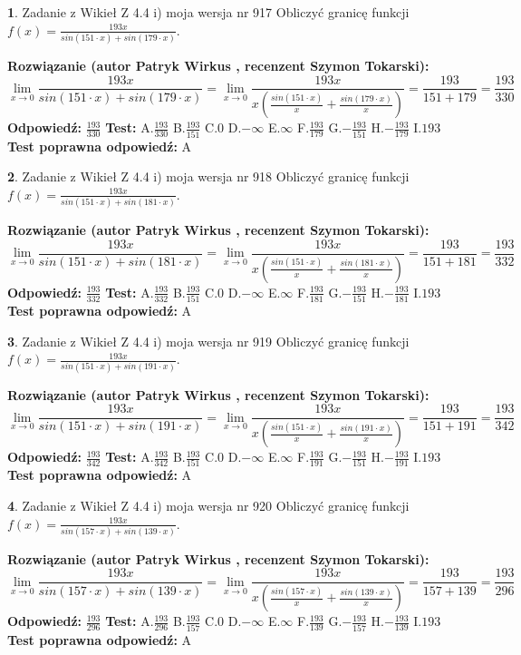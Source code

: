 \documentclass[12pt, a4paper]{article}
\theoremstyle{definition} %
\newtheorem{zad}{}
\newcommand{\zadStart}[1]{\begin{zad}#1\newline}
\newcommand{\zadStop}{\end{zad}}
\newcommand{\rozwStart}[2]{\noindent \textbf{Rozwiązanie (autor #1 , recenzent #2): }\newline}
\newcommand{\rozwStop}{\newline}
\newcommand{\odpStart}{\noindent \textbf{Odpowiedź:}\newline}
\newcommand{\odpStop}{\newline}
\newcommand{\testStart}{\noindent \textbf{Test:}\newline}
\newcommand{\testStop}{\newline}
\newcommand{\kluczStart}{\noindent \textbf{Test poprawna odpowiedź:}\newline}
\newcommand{\kluczStop}{\newline}
\begin{document}
\zadStart{Zadanie z Wikieł Z 4.4 i) moja wersja nr 917}
Obliczyć granicę funkcji $f(x)=\frac{193x}{sin(151\cdot x) +sin(179\cdot x)}$.
\zadStop
\rozwStart{Patryk Wirkus}{Szymon Tokarski}
$$\lim\limits_{x\to 0}\frac{193x}{sin(151\cdot x) +sin(179\cdot x)}=\lim\limits_{x\to 0}\frac{193x}{x(\frac{sin(151\cdot x)}{x}+\frac{sin(179\cdot x)}{x})}=\frac{193}{151+179} = \frac{193}{330}$$
\rozwStop
\odpStart
$\frac{193}{330}$
\odpStop
\testStart
A.$\frac{193}{330}$
B.$\frac{193}{151}$
C.$0$
D.$-\infty$
E.$\infty$
F.$\frac{193}{179}$
G.$-\frac{193}{151}$
H.$-\frac{193}{179}$
I.$193$
\testStop
\kluczStart
A
\kluczStop



\zadStart{Zadanie z Wikieł Z 4.4 i) moja wersja nr 918}
Obliczyć granicę funkcji $f(x)=\frac{193x}{sin(151\cdot x) +sin(181\cdot x)}$.
\zadStop
\rozwStart{Patryk Wirkus}{Szymon Tokarski}
$$\lim\limits_{x\to 0}\frac{193x}{sin(151\cdot x) +sin(181\cdot x)}=\lim\limits_{x\to 0}\frac{193x}{x(\frac{sin(151\cdot x)}{x}+\frac{sin(181\cdot x)}{x})}=\frac{193}{151+181} = \frac{193}{332}$$
\rozwStop
\odpStart
$\frac{193}{332}$
\odpStop
\testStart
A.$\frac{193}{332}$
B.$\frac{193}{151}$
C.$0$
D.$-\infty$
E.$\infty$
F.$\frac{193}{181}$
G.$-\frac{193}{151}$
H.$-\frac{193}{181}$
I.$193$
\testStop
\kluczStart
A
\kluczStop



\zadStart{Zadanie z Wikieł Z 4.4 i) moja wersja nr 919}
Obliczyć granicę funkcji $f(x)=\frac{193x}{sin(151\cdot x) +sin(191\cdot x)}$.
\zadStop
\rozwStart{Patryk Wirkus}{Szymon Tokarski}
$$\lim\limits_{x\to 0}\frac{193x}{sin(151\cdot x) +sin(191\cdot x)}=\lim\limits_{x\to 0}\frac{193x}{x(\frac{sin(151\cdot x)}{x}+\frac{sin(191\cdot x)}{x})}=\frac{193}{151+191} = \frac{193}{342}$$
\rozwStop
\odpStart
$\frac{193}{342}$
\odpStop
\testStart
A.$\frac{193}{342}$
B.$\frac{193}{151}$
C.$0$
D.$-\infty$
E.$\infty$
F.$\frac{193}{191}$
G.$-\frac{193}{151}$
H.$-\frac{193}{191}$
I.$193$
\testStop
\kluczStart
A
\kluczStop



\zadStart{Zadanie z Wikieł Z 4.4 i) moja wersja nr 920}
Obliczyć granicę funkcji $f(x)=\frac{193x}{sin(157\cdot x) +sin(139\cdot x)}$.
\zadStop
\rozwStart{Patryk Wirkus}{Szymon Tokarski}
$$\lim\limits_{x\to 0}\frac{193x}{sin(157\cdot x) +sin(139\cdot x)}=\lim\limits_{x\to 0}\frac{193x}{x(\frac{sin(157\cdot x)}{x}+\frac{sin(139\cdot x)}{x})}=\frac{193}{157+139} = \frac{193}{296}$$
\rozwStop
\odpStart
$\frac{193}{296}$
\odpStop
\testStart
A.$\frac{193}{296}$
B.$\frac{193}{157}$
C.$0$
D.$-\infty$
E.$\infty$
F.$\frac{193}{139}$
G.$-\frac{193}{157}$
H.$-\frac{193}{139}$
I.$193$
\testStop
\kluczStart
A
\kluczStop
\end{document}

